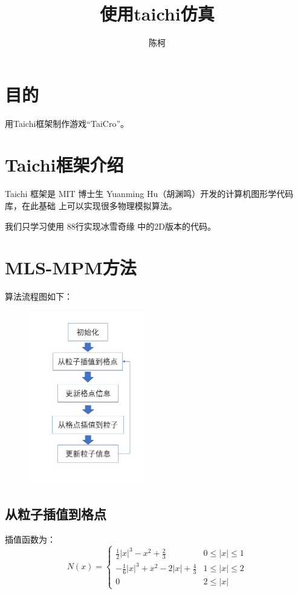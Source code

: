 \documentclass{article}
\title{使用taichi仿真}
\author{陈柯}
\begin{document}
	\maketitle
	
	\section{目的}
	
	用Taichi框架制作游戏“TaiCro”。
	
	\section{Taichi框架介绍}
	Taichi 框架是 MIT 博士生 Yuanming Hu（胡渊鸣）开发的计算机图形学代码库，在此基础
	上可以实现很多物理模拟算法。
	
	我们只学习使用 88行实现冰雪奇缘 中的2D版本的代码。
	\section{MLS-MPM方法}
	算法流程图如下：
	\begin{figure}[htb]
		\begin{center}
			\includegraphics[width=2in]{algorithm.jpg}
		\end{center}
	\end{figure}
	\subsection{从粒子插值到格点}
	插值函数为：
	\[N(x)=
	\begin{cases}
		\frac{1}{2}\lvert x\rvert^3-x^2+\frac{2}{3}&0\leq\lvert x\rvert\le1\\
		-\frac{1}{6}\lvert x\rvert^3+x^2-2\lvert 
		x\rvert+\frac{4}{3}&1\leq\lvert x\rvert\le2\\
		0&2\leq\lvert x\rvert
	\end{cases}        
	\]
	
\end{document}
